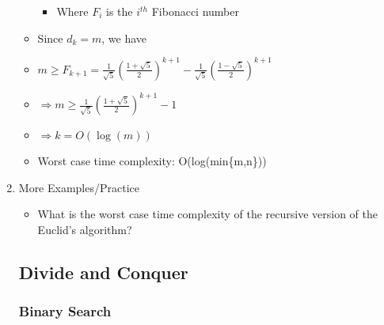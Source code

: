 \begin{enumerate}
\begin{itemize}
\begin{itemize}
    \item Where $F_{i}$ is the $i^{th}$ Fibonacci number
    \end{itemize}
  \item Since $d_{k}=m$, we have 
  \item [] $m\geq F_{k+1}=\frac{1}{\sqrt{5}}\left(\frac{1+\sqrt{5}}{2}\right)^{k+1} -\frac{1}{\sqrt{5}}\left(\frac{1-\sqrt{5}}{2}\right)^{k+1}$ 
  \item [] $\Rightarrow m\geq\frac{1}{\sqrt{5}}\left(\frac{1+\sqrt{5}}{2}\right)^{k+1}-1$ 
  \item [] $\Rightarrow k=O(\log{(m)})$
  \item Worst case time complexity: O(log(min\{m,n\}))
  \end{itemize}
\item {\color{green}More Examples/Practice}
  \begin{itemize}
  \item What is the worst case time complexity of the recursive version of the Euclid’s algorithm?
  \end{itemize}
\subsection{Divide and Conquer}
\subsubsection{Binary Search}
\end{enumerate}
